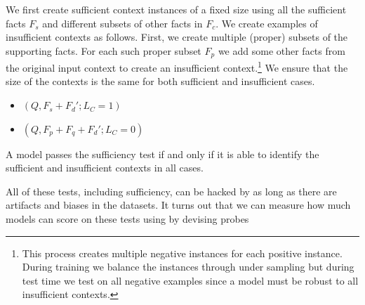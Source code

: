 



We first create sufficient context instances of a fixed size using all the sufficient facts $F_s$ and different subsets of other facts in $F_c$.
We create examples of insufficient contexts as follows. First, we create multiple (proper) subsets of the supporting facts. For each such proper subset $F_p$ we add some other facts from the original input context to create an insufficient context.\footnote{This process creates multiple negative instances for each positive instance. During training we balance the instances through under sampling but during test time we test on all negative examples since a model must be robust to all insufficient contexts.} We ensure that the size of the contexts is the same for both sufficient and insufficient cases.
\begin{itemize}[noitemsep]
    \item $(Q, F_s + F_d'; L_C=1)$
    \item $(Q, F_p + F_q + F_d'; L_C=0)$
\end{itemize}

A model passes the sufficiency test if and only if it is able to identify the sufficient and insufficient contexts in all cases. 

All of these \mfr tests, including sufficiency, can be hacked by \nmfr as long as there are artifacts and biases in the datasets. It turns out that we can measure how much models can score on these tests using \nmfr by devising probes 


